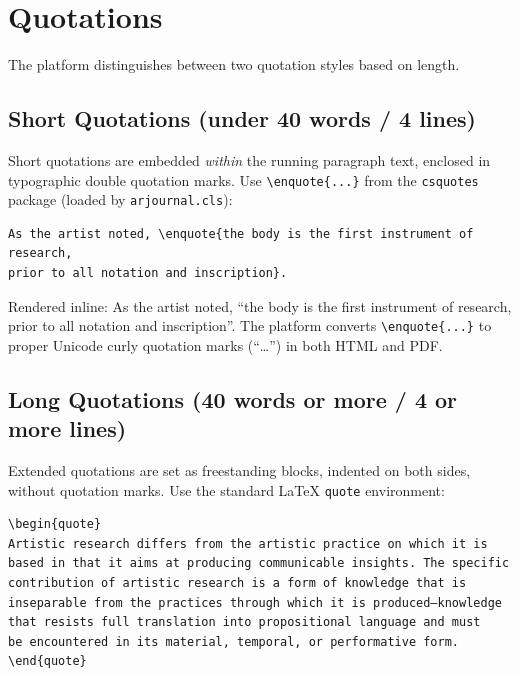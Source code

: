 \section{Quotations}

The platform distinguishes between two quotation styles based on length.

\subsection{Short Quotations (under 40 words / 4 lines)}

Short quotations are embedded \emph{within} the running paragraph text,
enclosed in typographic double quotation marks. Use \verb|\enquote{...}|
from the \texttt{csquotes} package (loaded by \texttt{arjournal.cls}):

\begin{verbatim}
As the artist noted, \enquote{the body is the first instrument of research,
prior to all notation and inscription}.
\end{verbatim}

Rendered inline: As the artist noted, \enquote{the body is the first instrument
of research, prior to all notation and inscription}. The platform converts
\verb|\enquote{...}| to proper Unicode curly quotation marks (\textquotedblleft\ldots\textquotedblright)
in both HTML and PDF.

\subsection{Long Quotations (40 words or more / 4 or more lines)}

Extended quotations are set as freestanding blocks, indented on both
sides, without quotation marks. Use the standard LaTeX \texttt{quote}
environment:

\begin{verbatim}
\begin{quote}
Artistic research differs from the artistic practice on which it is
based in that it aims at producing communicable insights. The specific
contribution of artistic research is a form of knowledge that is
inseparable from the practices through which it is produced—knowledge
that resists full translation into propositional language and must
be encountered in its material, temporal, or performative form.
\end{quote}
\end{verbatim}

